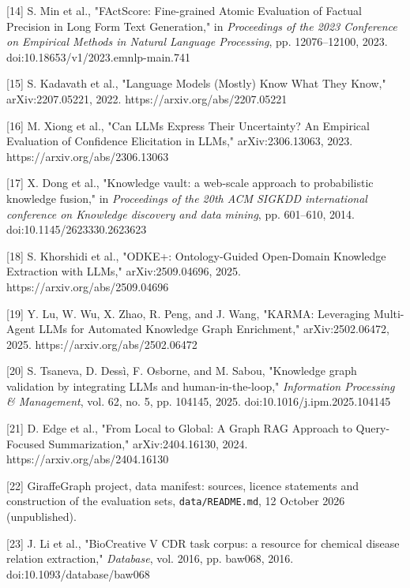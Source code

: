 \documentclass[
  english,
]{article}
\begin{document}
{[}14{]} S. Min et al., "FActScore: Fine-grained Atomic Evaluation of
Factual Precision in Long Form Text Generation," in \emph{Proceedings of
the 2023 Conference on Empirical Methods in Natural Language
Processing}, pp. 12076--12100, 2023. doi:10.18653/v1/2023.emnlp-main.741

{[}15{]} S. Kadavath et al., "Language Models (Mostly) Know What They
Know," arXiv:2207.05221, 2022. https://arxiv.org/abs/2207.05221

{[}16{]} M. Xiong et al., "Can LLMs Express Their Uncertainty? An
Empirical Evaluation of Confidence Elicitation in LLMs,"
arXiv:2306.13063, 2023. https://arxiv.org/abs/2306.13063

{[}17{]} X. Dong et al., "Knowledge vault: a web-scale approach to
probabilistic knowledge fusion," in \emph{Proceedings of the 20th ACM
SIGKDD international conference on Knowledge discovery and data mining},
pp. 601--610, 2014. doi:10.1145/2623330.2623623

{[}18{]} S. Khorshidi et al., "ODKE+: Ontology-Guided Open-Domain
Knowledge Extraction with LLMs," arXiv:2509.04696, 2025.
https://arxiv.org/abs/2509.04696

{[}19{]} Y. Lu, W. Wu, X. Zhao, R. Peng, and J. Wang, "KARMA: Leveraging
Multi-Agent LLMs for Automated Knowledge Graph Enrichment,"
arXiv:2502.06472, 2025. https://arxiv.org/abs/2502.06472

{[}20{]} S. Tsaneva, D. Dessì, F. Osborne, and M. Sabou, "Knowledge
graph validation by integrating LLMs and human-in-the-loop,"
\emph{Information Processing \& Management}, vol. 62, no. 5, pp. 104145,
2025. doi:10.1016/j.ipm.2025.104145

{[}21{]} D. Edge et al., "From Local to Global: A Graph RAG Approach to
Query-Focused Summarization," arXiv:2404.16130, 2024.
https://arxiv.org/abs/2404.16130

{[}22{]} GiraffeGraph project, data manifest: sources, licence
statements and construction of the evaluation sets,
\texttt{data/README.md}, 12 October 2026 (unpublished).

{[}23{]} J. Li et al., "BioCreative V CDR task corpus: a resource for
chemical disease relation extraction," \emph{Database}, vol. 2016, pp.
baw068, 2016. doi:10.1093/database/baw068
\end{document}
